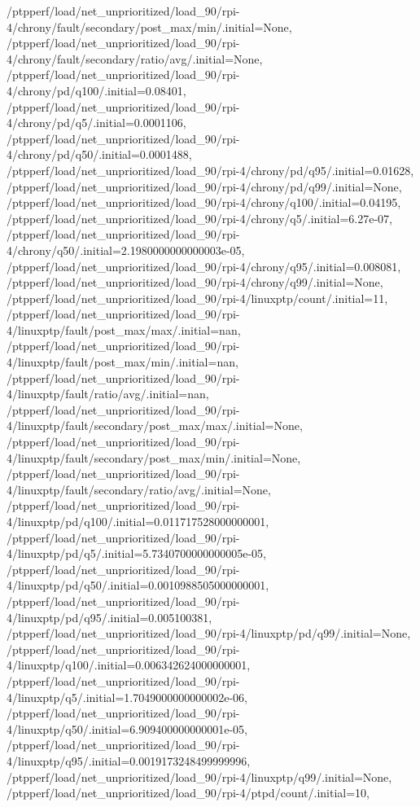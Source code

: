 {    /ptpperf/load/net_unprioritized/load_90/rpi-4/chrony/fault/secondary/post_max/min/.initial=None,
    /ptpperf/load/net_unprioritized/load_90/rpi-4/chrony/fault/secondary/ratio/avg/.initial=None,
    /ptpperf/load/net_unprioritized/load_90/rpi-4/chrony/pd/q100/.initial=0.08401,
    /ptpperf/load/net_unprioritized/load_90/rpi-4/chrony/pd/q5/.initial=0.0001106,
    /ptpperf/load/net_unprioritized/load_90/rpi-4/chrony/pd/q50/.initial=0.0001488,
    /ptpperf/load/net_unprioritized/load_90/rpi-4/chrony/pd/q95/.initial=0.01628,
    /ptpperf/load/net_unprioritized/load_90/rpi-4/chrony/pd/q99/.initial=None,
    /ptpperf/load/net_unprioritized/load_90/rpi-4/chrony/q100/.initial=0.04195,
    /ptpperf/load/net_unprioritized/load_90/rpi-4/chrony/q5/.initial=6.27e-07,
    /ptpperf/load/net_unprioritized/load_90/rpi-4/chrony/q50/.initial=2.1980000000000003e-05,
    /ptpperf/load/net_unprioritized/load_90/rpi-4/chrony/q95/.initial=0.008081,
    /ptpperf/load/net_unprioritized/load_90/rpi-4/chrony/q99/.initial=None,
    /ptpperf/load/net_unprioritized/load_90/rpi-4/linuxptp/count/.initial=11,
    /ptpperf/load/net_unprioritized/load_90/rpi-4/linuxptp/fault/post_max/max/.initial=nan,
    /ptpperf/load/net_unprioritized/load_90/rpi-4/linuxptp/fault/post_max/min/.initial=nan,
    /ptpperf/load/net_unprioritized/load_90/rpi-4/linuxptp/fault/ratio/avg/.initial=nan,
    /ptpperf/load/net_unprioritized/load_90/rpi-4/linuxptp/fault/secondary/post_max/max/.initial=None,
    /ptpperf/load/net_unprioritized/load_90/rpi-4/linuxptp/fault/secondary/post_max/min/.initial=None,
    /ptpperf/load/net_unprioritized/load_90/rpi-4/linuxptp/fault/secondary/ratio/avg/.initial=None,
    /ptpperf/load/net_unprioritized/load_90/rpi-4/linuxptp/pd/q100/.initial=0.011717528000000001,
    /ptpperf/load/net_unprioritized/load_90/rpi-4/linuxptp/pd/q5/.initial=5.7340700000000005e-05,
    /ptpperf/load/net_unprioritized/load_90/rpi-4/linuxptp/pd/q50/.initial=0.0010988505000000001,
    /ptpperf/load/net_unprioritized/load_90/rpi-4/linuxptp/pd/q95/.initial=0.005100381,
    /ptpperf/load/net_unprioritized/load_90/rpi-4/linuxptp/pd/q99/.initial=None,
    /ptpperf/load/net_unprioritized/load_90/rpi-4/linuxptp/q100/.initial=0.006342624000000001,
    /ptpperf/load/net_unprioritized/load_90/rpi-4/linuxptp/q5/.initial=1.7049000000000002e-06,
    /ptpperf/load/net_unprioritized/load_90/rpi-4/linuxptp/q50/.initial=6.909400000000001e-05,
    /ptpperf/load/net_unprioritized/load_90/rpi-4/linuxptp/q95/.initial=0.0019173248499999996,
    /ptpperf/load/net_unprioritized/load_90/rpi-4/linuxptp/q99/.initial=None,
    /ptpperf/load/net_unprioritized/load_90/rpi-4/ptpd/count/.initial=10,
}
